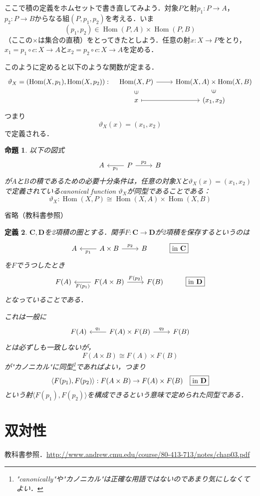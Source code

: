 \documentclass[dvipdfmx,a4j,10pt]{jsarticle}
\makeatletter
\theoremstyle{mystyle1}
\newtheorem{dfn}{定義}[section]
\newtheorem{prop}[dfn]{命題}
\theoremstyle{mystyle2}
\renewenvironment{proof}[1][\proofname]{\par
  \pushQED{\qed}%
  \normalfont
  \topsep6\p@\@plus6\p@ \trivlist
  \item[\hskip\labelsep{\bfseries\sffamily #1}]\ignorespaces
}{%
  \popQED\endtrivlist\@endpefalse
}
\renewcommand\proofname{証明}
\DeclareMathOperator{\Hom}{Hom}
\makeatother
\begin{document}
ここで積の定義をホムセットで書き直してみよう．対象$P$と射$p_1:P\to A$，$p_2:P\to B$からなる組$(P,p_1,p_2)$を考える．いま
\[
	(p_1,p_2)\in\Hom(P,A)\times \Hom(P,B)
\]
（ここの$\times$は集合の直積）をとってきたとしよう．任意の射$x:X\to P$をとり，$x_1=p_1\circ c:X\to A$と$x_2=p_2\circ c:X\to A$を定める．

このように定めると以下のような関数が定まる．
\[
	\begin{tikzcd}
		\vartheta_X=(\Hom(X,p_1),\Hom(X,p_2)): &[-4ex] \Hom(X,P) \arrow[r] \arrow[d,phantom,"\rotatebox{90}{$\in$}"] & \Hom(X,A)\times \Hom(X,B) \arrow[d,phantom,"\rotatebox{90}{$\in$}"] \\[-2ex]
		& x \arrow[r,mapsto] & (x_1,x_2)
	\end{tikzcd}
\]
つまり
\[
	\vartheta_X(x)=(x_1,x_2)
\]
で定義される．

\begin{prop}
	以下の図式
	\[
		\begin{tikzcd} A & P \arrow[l,"p_1"] \arrow[r,"p_2"] & B\end{tikzcd}
	\]
	が$A$と$B$の積であるための必要十分条件は，任意の対象$X$と$\vartheta_X(x)=(x_1,x_2)$で定義されているcanonical function $\vartheta_X$が同型であることである：
	\[
		\vartheta_X:\Hom(X,P)\cong \Hom(X,A)\times\Hom(X,B)
	\]
\end{prop}

\begin{proof}
	省略（教科書参照）
\end{proof}

\begin{dfn}
	$\mathbf{C},\mathbf{D}$を2項積の圏とする．関手$F:\mathbf{C}\to \mathbf{D}$が2項積を保存するというのは
	\[
		\begin{tikzcd}
			A & A\times B \arrow[l,"p_1"] \arrow[r,"p_2"] & B & \fbox{in $\mathbf{C}$}
		\end{tikzcd}
	\]
	を$F$でうつしたとき
	\[
		\begin{tikzcd}
			F(A) & F(A\times B) \arrow[l,"F(p_1)"] \arrow[r,"F(p_2)"] & F(B) & \fbox{in $\mathbf{D}$}
		\end{tikzcd}
	\]
	となっていることである．

	これは一般に
	\[
		\begin{tikzcd}
			F(A) & F(A)\times F(B) \arrow[l,"q_1"'] \arrow[r,"q_2"] & F(B)
		\end{tikzcd}
	\]
	とは必ずしも一致しないが，
	\[
		F(A\times B)\cong F(A)\times F(B)
	\]
	が"カノニカル"に同型\footnote{"canonically"や"カノニカル"は正確な用語ではないのであまり気にしなくてよい．}であればよい，つまり
	\[
		\langle F(p_1),F(p_2) \rangle :F(A\times B)\to F(A)\times F(B)\quad \fbox{in $\mathbf{D}$}
	\]
	という射$\langle F(p_1),F(p_2) \rangle$を構成できるという意味で定められた同型である．
\end{dfn}


\section{双対性}

教科書参照．\url{http://www.andrew.cmu.edu/course/80-413-713/notes/chap03.pdf}
\end{document}
